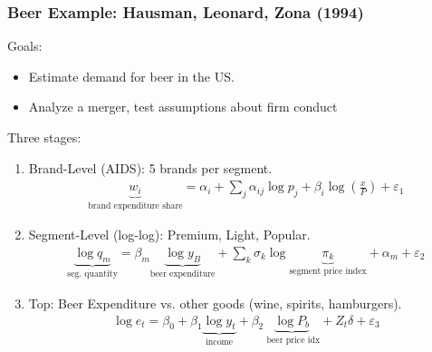 \documentclass[xcolor=pdftex,dvipsnames,table,mathserif,aspectratio=169]{beamer}
\begin{document}
\begin{frame}
\frametitle{Beer Example: Hausman, Leonard, Zona (1994)}
\small
Goals:
\begin{itemize}
\item Estimate demand for beer in the US.
\item Analyze a merger, test assumptions about firm conduct
\end{itemize}
Three stages:
\begin{enumerate}
\item Brand-Level (AIDS): 5 brands per segment.
\begin{eqnarray*}
\underbrace{w_i}_{\text{brand expenditure share}} = \alpha_i + \sum_j \alpha_{ij} \log p_j + \beta_i \log \left(\frac{x}{P} \right) + \varepsilon_1
\end{eqnarray*}
\item Segment-Level (log-log): Premium, Light, Popular.
\begin{eqnarray*}
\underbrace{\log q_m}_{\text{seg. quantity}} = \beta_m \underbrace{\log y_B}_{ \text{beer expenditure}} + \sum_k \sigma_k \log \underbrace{\pi_k}_{\text{segment price index}} + \alpha_m + \varepsilon_2
\end{eqnarray*}
\item Top: Beer Expenditure  vs. other goods (wine, spirits, hamburgers).
\begin{eqnarray*}
\log e_t = \beta_0 + \beta_1 \underbrace{\log y_t}_{\text{income}} + \beta_2 \underbrace{\log P_b}_{\text{ beer price idx}} + Z_t \delta + \varepsilon_3
\end{eqnarray*}
\end{enumerate}
\end{frame} 
\end{document}
